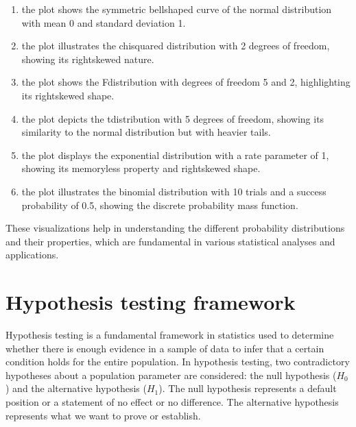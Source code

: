 \documentclass[letterpaper,10pt,english]{jupyterBook}
\begin{document}
\begin{enumerate}
%
\item {} 
\sphinxAtStartPar
{} the plot shows the symmetric bell\sphinxhyphen{}shaped curve of the normal distribution with mean 0 and standard deviation 1.

\item {} 
\sphinxAtStartPar
{} the plot illustrates the chi\sphinxhyphen{}squared distribution with 2 degrees of freedom, showing its right\sphinxhyphen{}skewed nature.

\item {} 
\sphinxAtStartPar
{} the plot shows the F\sphinxhyphen{}distribution with degrees of freedom 5 and 2, highlighting its right\sphinxhyphen{}skewed shape.

\item {} 
\sphinxAtStartPar
{} the plot depicts the t\sphinxhyphen{}distribution with 5 degrees of freedom, showing its similarity to the normal distribution but with heavier tails.

\item {} 
\sphinxAtStartPar
{} the plot displays the exponential distribution with a rate parameter of 1, showing its memoryless property and right\sphinxhyphen{}skewed shape.

\item {} 
\sphinxAtStartPar
{} the plot illustrates the binomial distribution with 10 trials and a success probability of 0.5, showing the discrete probability mass function.

\end{enumerate}

\sphinxAtStartPar
These visualizations help in understanding the different probability distributions and their properties, which are fundamental in various statistical analyses and applications.


\section{Hypothesis testing framework}
\label{\detokenize{notebooks/review_stats:hypothesis-testing-framework}}
\sphinxAtStartPar
Hypothesis testing is a fundamental framework in statistics used to determine whether there is enough evidence in a sample of data to infer that a certain condition holds for the entire population. In hypothesis testing, two contradictory hypotheses about a population parameter are considered: the null hypothesis (\(H_0\)) and the alternative hypothesis (\(H_1\)). The null hypothesis represents a default position or a statement of no effect or no difference. The alternative hypothesis represents what we want to prove or establish.
\end{document}
